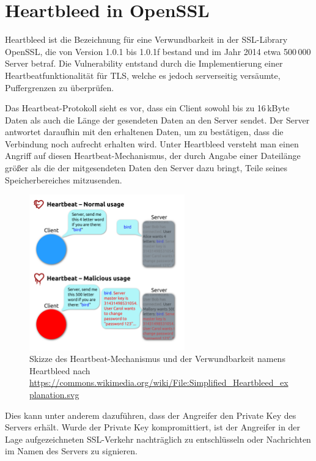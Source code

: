 \chapter{Heartbleed in OpenSSL}

Heartbleed ist die Bezeichnung für eine Verwundbarkeit in der SSL-Library OpenSSL, die von Version 1.0.1 bis 1.0.1f bestand und im Jahr 2014 etwa 500\,000 Server betraf. Die Vulnerability entstand durch die Implementierung einer Heartbeatfunktionalität für TLS, welche es jedoch serverseitig versäumte, Puffergrenzen zu überprüfen.

Das Heartbeat-Protokoll sieht es vor, dass ein Client sowohl bis zu 16\,kByte Daten als auch die Länge der gesendeten Daten an den Server sendet. Der Server antwortet daraufhin mit den erhaltenen Daten, um zu bestätigen, dass die Verbindung noch aufrecht erhalten wird. Unter Heartbleed versteht man einen Angriff auf diesen Heartbeat-Mechanismus, der durch Angabe einer Dateilänge größer als die der mitgesendeten Daten den Server dazu bringt, Teile seines Speicherbereiches mitzusenden.

\begin{figure}[ht!]
	\centering
	\includegraphics[width=0.6\textwidth]{images/Heartbleed/heartbleed.png}
	\caption{Skizze des Heartbeat-Mechanismus und der Verwundbarkeit namens Heartbleed nach \url{https://commons.wikimedia.org/wiki/File:Simplified_Heartbleed_explanation.svg}}
\end{figure}



Dies kann unter anderem dazuführen, dass der Angreifer den Private Key des Servers erhält. Wurde der Private Key kompromittiert, ist der Angreifer in der Lage aufgezeichneten SSL-Verkehr nachträglich zu entschlüsseln oder Nachrichten im Namen des Servers zu signieren.

